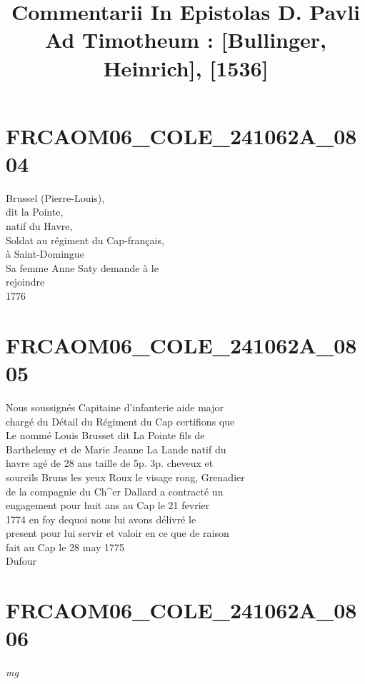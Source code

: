 \documentclass{article}
\begin{document}
\date{}
\title{Commentarii In Epistolas D. Pavli Ad Timotheum : [Bullinger, Heinrich], [1536]}
\maketitle
\tableofcontents
\clearpage
\begin{pages} 
\beginnumbering

\section{FRCAOM06\_COLE\_241062A\_0804}\pstart
Brussel (Pierre-Louis),\\
dit la Pointe,\\
natif du Havre,\\
Soldat au régiment du Cap-français,\\
à Saint-Domingue\\
Sa femme Anne Saty demande à le\\
rejoindre\\
1776
\pend
\endnumbering\beginnumbering\section{FRCAOM06\_COLE\_241062A\_0805}\pstart
Nous soussignés Capitaine d'infanterie aide major\\
chargé du Détail du Régiment du Cap certifions que\\
Le nommé Louis Brusset dit La Pointe fils de\\
Barthelemy et de Marie Jeanne La Lande natif du\\
havre agé de 28 ans taille de 5p. 3p. cheveux et\\
sourcils Bruns les yeux Roux le visage rong, Grenadier\\
de la compagnie du Ch\^{}er Dallard a contracté un\\
engagement pour huit ans au Cap le 21 fevrier\\
1774 en foy dequoi nous lui avons délivré le\\
present pour lui servir et valoir en ce que de raison\\
fait au Cap le 28 may 1775\\
Dufour
\pend
\endnumbering\beginnumbering\section{FRCAOM06\_COLE\_241062A\_0806}
\vspace{0.5cm}\noindent
\textit{mg}

\end{pages}
\end{document}
